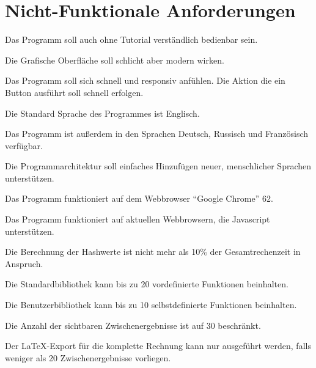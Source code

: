 \documentclass[parskip=full,11pt,twoside]{scrartcl}
\begin{document}
\newpage
\section{Nicht-Funktionale Anforderungen}

Das Programm soll auch ohne Tutorial verständlich bedienbar sein.

Die Grafische Oberfläche soll schlicht aber modern wirken.

Das Programm soll sich schnell und responsiv anfühlen. Die Aktion die ein Button ausführt soll schnell erfolgen.

Die Standard Sprache des Programmes ist Englisch.

Das Programm ist außerdem in den Sprachen Deutsch, Russisch und Französisch verfügbar.

Die Programmarchitektur soll einfaches Hinzufügen neuer, menschlicher Sprachen unterstützen.

Das Programm funktioniert auf dem Webbrowser \enquote{Google Chrome} 62.

Das Programm funktioniert auf aktuellen Webbrowsern, die Javascript unterstützen.

Die Berechnung der Hashwerte ist nicht mehr als 10\% der Gesamtrechenzeit in Anspruch.

Die Standardbibliothek kann bis zu 20 vordefinierte Funktionen beinhalten.

Die Benutzerbibliothek kann bis zu 10 selbstdefinierte Funktionen beinhalten.

Die Anzahl der sichtbaren Zwischenergebnisse ist auf 30 beschränkt.

Der LaTeX-Export für die komplette Rechnung kann nur ausgeführt werden, falls weniger als 20 Zwischenergebnisse vorliegen.
\end{document}
